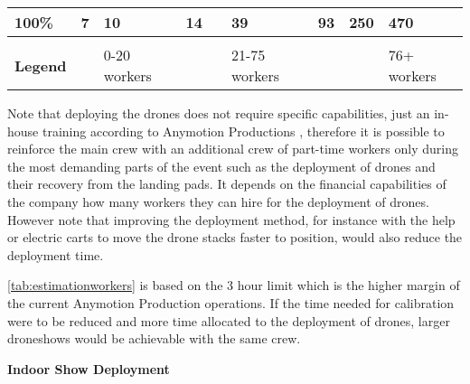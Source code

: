 \begin{table}[h]
{\begin{tabular}{lllllllp{2cm}p{2cm}}
\multicolumn{1}{|l|}{\textbf{100\%}} & \multicolumn{1}{l|}{\cellcolor[HTML]{E2EFDA}7} & \multicolumn{1}{l|}{\cellcolor[HTML]{E2EFDA}10} & \multicolumn{1}{l|}{\cellcolor[HTML]{E2EFDA}14} & \multicolumn{1}{l|}{\cellcolor[HTML]{FFF2CC}{\color[HTML]{000000} 22}} & \multicolumn{1}{l|}{\cellcolor[HTML]{FFF2CC}39} & \multicolumn{1}{l|}{\cellcolor[HTML]{FCE4D6}93} & \multicolumn{1}{l|}{\cellcolor[HTML]{FCE4D6}250} & \multicolumn{1}{l|}{\cellcolor[HTML]{FCE4D6}470} \\ \hline
\textbf{} &  &  &  &  &  &  &  &  \\ \hline
\multicolumn{1}{|l|}{\textbf{Legend}} & \multicolumn{1}{l|}{\cellcolor[HTML]{E2EFDA}} & \multicolumn{1}{l|}{0-20 workers} & \multicolumn{1}{l|}{} & \multicolumn{1}{l|}{\cellcolor[HTML]{FFF2CC}} & \multicolumn{1}{l|}{21-75 workers} & \multicolumn{1}{l|}{} & \multicolumn{1}{l|}{\cellcolor[HTML]{FCE4D6}} & \multicolumn{1}{l|}{76+ workers} \\ \hline
\end{tabular}%
}
\end{table}

Note that deploying the drones does not require specific capabilities, just an in-house training according to Anymotion Productions , therefore it is possible to reinforce the main crew with an additional crew of part-time workers only during the most demanding parts of the event such as the deployment of drones and their recovery from the landing pads. It depends on the financial capabilities of the company how many workers they can hire for the deployment of drones. However note that improving the deployment method, for instance with the help or electric carts to move the drone stacks faster to position, would also reduce the deployment time.

\autoref{tab:estimationworkers} is based on the 3 hour limit which is the higher margin of the current Anymotion Production operations. If the time needed for calibration were to be reduced and more time allocated to the deployment of drones, larger droneshows would be achievable with the same crew. 

\textbf{Indoor Show Deployment}

